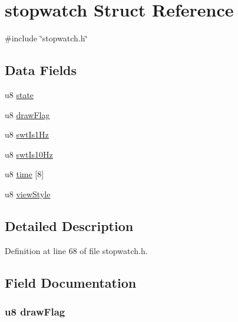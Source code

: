 \hypertarget{structstopwatch}{\section{stopwatch \-Struct \-Reference}
\label{structstopwatch}
}


{\ttfamily \#include \char`\"{}stopwatch.\-h\char`\"{}}

\subsection*{\-Data \-Fields}
\begin{DoxyCompactItemize}
\item 
u8 \hyperlink{structstopwatch_ad0bc4e4e6e6ffc52d9079b73afd73887}{state}
\item 
u8 \hyperlink{structstopwatch_a3e8544bc695992c4f9df78288018341b}{draw\-Flag}
\item 
u8 \hyperlink{structstopwatch_a26bbaf3a098503cb253a15db2ea626c3}{swt\-Is1\-Hz}
\item 
u8 \hyperlink{structstopwatch_a59a4bb7692742b89191e778942eeccba}{swt\-Is10\-Hz}
\item 
u8 \hyperlink{structstopwatch_a2789a512c999ccb6743da309f32eec05}{time} \mbox{[}8\mbox{]}
\item 
u8 \hyperlink{structstopwatch_a1c3b9f9d799364d05f9abf6892baddef}{view\-Style}
\end{DoxyCompactItemize}


\subsection{\-Detailed \-Description}


\-Definition at line 68 of file stopwatch.\-h.



\subsection{\-Field \-Documentation}
\hypertarget{structstopwatch_a3e8544bc695992c4f9df78288018341b}{
\subsubsection[{draw\-Flag}]{\setlength{\rightskip}{0pt plus 5cm}u8 {\bf draw\-Flag}}}\label{structstopwatch_a3e8544bc695992c4f9df78288018341b}



